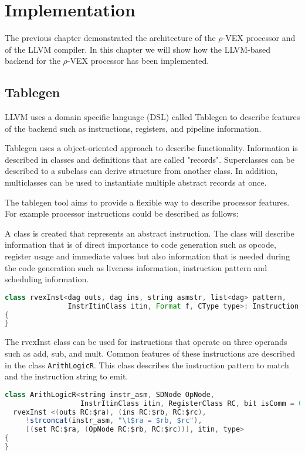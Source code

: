 \chapter{Implementation}
\label{chap:implementation}
The previous chapter demonstrated the architecture of the $\rho$-VEX processor and of the LLVM compiler. In this chapter we will show how the LLVM-based backend for the $\rho$-VEX processor has been implemented.

\section{Tablegen}
LLVM uses a domain specific language (DSL) called Tablegen to describe features of the backend such as instructions, registers, and pipeline information. 

Tablegen uses a object-oriented approach to describe functionality. Information is described in classes and definitions that are called "records". Superclasses can be described to a subclass can derive structure from another class. In addition, multiclasses can be used to instantiate multiple abstract records at once.

The tablegen tool aims to provide a flexible way to describe processor features. For example processor instructions could be described as follows:

A class is created that represents an abstract instruction. The class will describe information that is of direct importance to code generation such as opcode, register usage and immediate values but also information that is needed during the code generation such as liveness information, instruction pattern and scheduling information.

\begin{lstlisting}[language=java]
class rvexInst<dag outs, dag ins, string asmstr, list<dag> pattern,
               InstrItinClass itin, Format f, CType type>: Instruction
{
}
\end{lstlisting}

The rvexInst class can be used for instructions that operate on three operands such as add, sub, and mult. Common features of these instructions are described in the class \texttt{ArithLogicR}. This class describes the instruction pattern to match and the instruction string to emit. 
\begin{lstlisting}[language=java]
class ArithLogicR<string instr_asm, SDNode OpNode,
                  InstrItinClass itin, RegisterClass RC, bit isComm = 0, CType type>:
  rvexInst <(outs RC:$ra), (ins RC:$rb, RC:$rc),
     !strconcat(instr_asm, "\t$ra = $rb, $rc"),
     [(set RC:$ra, (OpNode RC:$rb, RC:$rc))], itin, type> 
{
}
\end{lstlisting}

